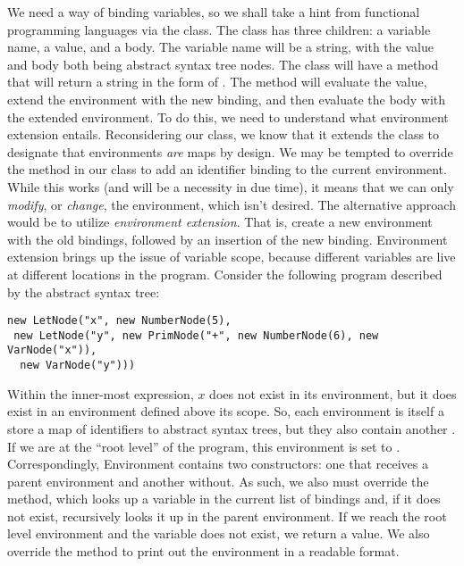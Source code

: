 We need a way of binding variables, so we shall take a hint from functional programming languages via the  class. The  class has three children: a variable name, a value, and a body. The variable name will be a string, with the value and body both being abstract syntax tree nodes. The  class will have a  method that will return a string in the form of . The  method will evaluate the value, extend the environment with the new binding, and then evaluate the body with the extended environment. To do this, we need to understand what environment extension entails. Reconsidering our  class, we know that it extends the  class to designate that environments \textit{are} maps by design. We may be tempted to override the  method in our  class to add an identifier binding to the current environment. While this works (and will be a necessity in due time), it means that we can only \textit{modify}, or \textit{change}, the environment, which isn't desired. The alternative approach would be to utilize \textit{environment extension}. That is, create a new environment with the old bindings, followed by an insertion of the new binding. Environment extension brings up the issue of variable scope, because different variables are live at different locations in the program. Consider the following program described by the abstract syntax tree:

\par{\footnotesize
\begin{verbatim}
new LetNode("x", new NumberNode(5), 
 new LetNode("y", new PrimNode("+", new NumberNode(6), new VarNode("x")), 
  new VarNode("y")))
\end{verbatim}
}
  
Within the inner-most  expression, $x$ does not exist in its environment, but it does exist in an environment defined above its scope. So, each environment is itself a store a map of identifiers to abstract syntax trees, but they also contain another . If we are at the ``root level'' of the program, this environment is set to . Correspondingly, Environment contains two constructors: one that receives a parent environment and another without. As such, we also must override the  method, which looks up a variable in the current list of bindings and, if it does not exist, recursively looks it up in the parent environment. If we reach the root level environment and the variable does not exist, we return a  value. We also override the  method to print out the environment in a readable format.

